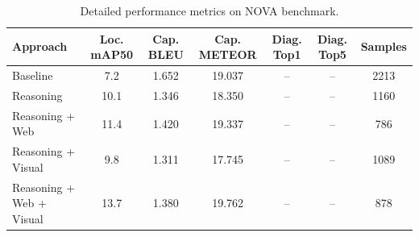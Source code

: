 \begin{table}[t]
  \caption{Detailed performance metrics on NOVA benchmark.}
  \label{tab:detailed_performance}
  \centering
  \begin{tabular}{lcccccc}
    \hline
    \textbf{Approach} & \textbf{Loc. mAP50} & \textbf{Cap. BLEU} & \textbf{Cap. METEOR} & \textbf{Diag. Top1} & \textbf{Diag. Top5} & \textbf{Samples}\\
    \hline
    Baseline             & 7.2 & 1.652 & 19.037 & -- & -- & 2213\\
    Reasoning            & 10.1 & 1.346 & 18.350 & -- & -- & 1160\\
    Reasoning + Web      & 11.4 & 1.420 & 19.337 & -- & -- & 786\\
    Reasoning + Visual   & 9.8 & 1.311 & 17.745 & -- & -- & 1089\\
    Reasoning + Web + Visual & 13.7 & 1.380 & 19.762 & -- & -- & 878\\
    \hline
  \end{tabular}
\end{table}